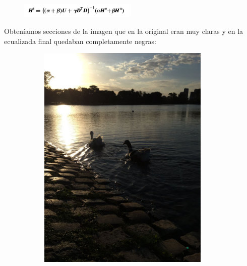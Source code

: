 \documentclass[10pt, a4paper]{article}
\begin{document}
\begin{figure}[H]
	\centering
        \includegraphics[width=0.5\textwidth]{calculo-H.png}
\end{figure}

Obteníamos secciones de la imagen que en la original eran muy claras y en la ecualizada final quedaban completamente negras:

\begin{figure}[H]	
	\centering
    \begin{subfigure}{0.5\textwidth}
	\centering
        \includegraphics[width=0.9\textwidth]{patitos1.jpg}
    \end{subfigure}\hfill
    \begin{subfigure}{0.5\textwidth}
    	\centering

\end{subfigure}
\end{figure}
\end{document}
